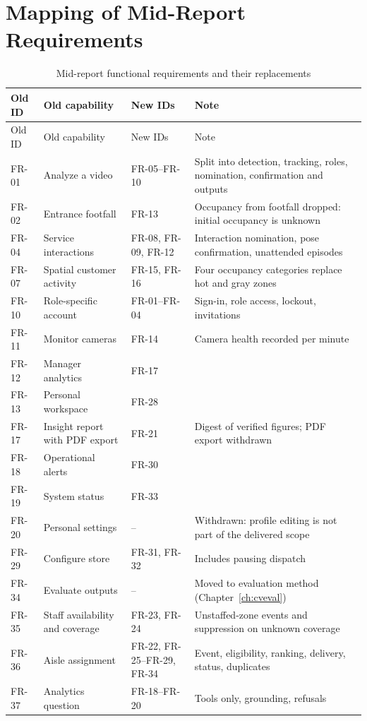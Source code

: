 \section{Mapping of Mid-Report Requirements}
\begin{longtable}{P{0.11\textwidth}P{0.3\textwidth}P{0.18\textwidth}P{0.33\textwidth}}
\caption{Mid-report functional requirements and their replacements}\label{tab:fr-map}\\
\toprule
Old ID & Old capability & New IDs & Note\\
\midrule
\endfirsthead
\toprule
Old ID & Old capability & New IDs & Note\\
\midrule
\endhead
\bottomrule
\endfoot
FR-01 & Analyze a video & FR-05--FR-10 & Split into detection, tracking, roles, nomination, confirmation and outputs\\
FR-02 & Entrance footfall & FR-13 & Occupancy from footfall dropped: initial occupancy is unknown\\
FR-04 & Service interactions & FR-08, FR-09, FR-12 & Interaction nomination, pose confirmation, unattended episodes\\
FR-07 & Spatial customer activity & FR-15, FR-16 & Four occupancy categories replace hot and gray zones\\
FR-10 & Role-specific account & FR-01--FR-04 & Sign-in, role access, lockout, invitations\\
FR-11 & Monitor cameras & FR-14 & Camera health recorded per minute\\
FR-12 & Manager analytics & FR-17 & \\
FR-13 & Personal workspace & FR-28 & \\
FR-17 & Insight report with PDF export & FR-21 & Digest of verified figures; PDF export withdrawn\\
FR-18 & Operational alerts & FR-30 & \\
FR-19 & System status & FR-33 & \\
FR-20 & Personal settings & -- & Withdrawn: profile editing is not part of the delivered scope\\
FR-29 & Configure store & FR-31, FR-32 & Includes pausing dispatch\\
FR-34 & Evaluate outputs & -- & Moved to evaluation method (Chapter~\ref{ch:cveval})\\
FR-35 & Staff availability and coverage & FR-23, FR-24 & Unstaffed-zone events and suppression on unknown coverage\\
FR-36 & Aisle assignment & FR-22, FR-25--FR-29, FR-34 & Event, eligibility, ranking, delivery, status, duplicates\\
FR-37 & Analytics question & FR-18--FR-20 & Tools only, grounding, refusals\\
\end{longtable}
